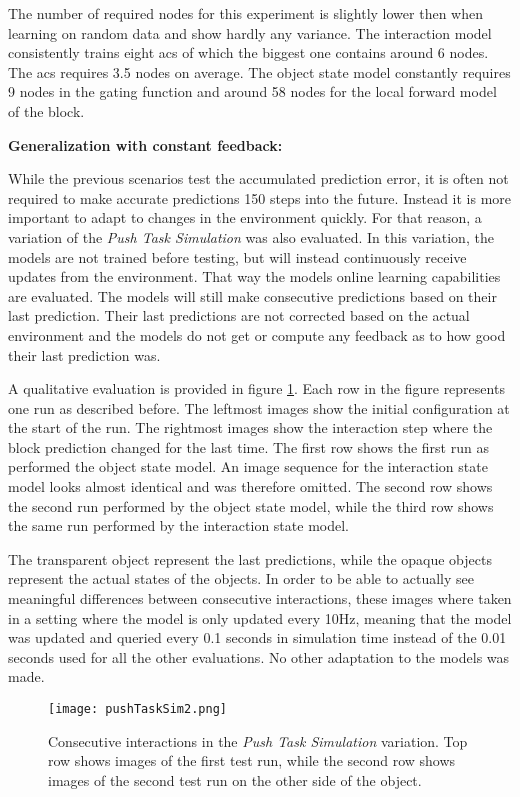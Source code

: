 The number of required nodes for this experiment is slightly lower then when learning on random data and show hardly any variance. The interaction model consistently trains eight \glspl{ac} of which the biggest one contains around 6 nodes. The \gls{acs} requires 3.5 nodes on average. 
The object state model constantly requires 9 nodes in the gating function and around 58 nodes for the local forward model of the block.

\textbf{Generalization with constant feedback:}

While the previous scenarios test the accumulated prediction error, it is often not required to make accurate predictions 150 steps into the future. Instead it is more important to adapt to changes in the environment quickly. For that reason, a variation of the \textit{Push Task Simulation} was also evaluated. In this variation, the models are not trained before testing, but will instead continuously receive updates from the environment. That way the models online learning capabilities are evaluated. The models will still make consecutive predictions based on their last prediction. Their last predictions are not corrected based on the actual environment and the models do not get or compute any feedback as to how good their last prediction was. 

A qualitative evaluation is provided in figure \ref{fig:pushTaskSim2}. Each row in the figure represents one run as described before. The leftmost images show the initial configuration at the start of the run. The rightmost images show the interaction step where the block prediction changed for the last time. 
The first row shows the first run as performed the object state model. An image sequence for the interaction state model looks almost identical and was therefore omitted. The second row shows the second run performed by the object state model, while the third row shows the same run performed by the interaction state model.

The transparent object represent the last predictions, while the opaque objects represent the actual states of the objects. 
In order to be able to actually see meaningful differences between consecutive interactions, these images where taken in a setting where the model is only updated every 10Hz, meaning that the model was updated and queried every 0.1 seconds in simulation time instead of the 0.01 seconds used for all the other evaluations. No other adaptation to the models was made. 

\begin{figure}
\centering
\texttt{[image: pushTaskSim2.png]}
\caption{Consecutive interactions in the \textit{Push Task Simulation} variation. Top row shows images of the first test run, while the second row shows images of the second test run on the other side of the object. }
\label{fig:pushTaskSim2}
\end{figure}

